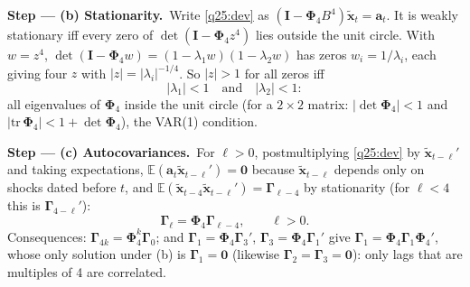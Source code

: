 \documentclass[11pt,a4paper]{article}
\numberwithin{equation}{questao}   %
\newcommand{\passo}[2]{\par\smallskip\noindent\textbf{Step --- #1.}~#2}
\newcommand{\E}{\mathbb{E}}
\begin{document}
\begin{sol}
\passo{(b) Stationarity}{Write \eqref{q25:dev} as $(\mathbf I-\boldsymbol\Phi_4B^4)\tilde{\mathbf x}_t=\mathbf a_t$.
It is weakly stationary iff every zero of $\det(\mathbf I-\boldsymbol\Phi_4z^4)$ lies outside the unit
circle. With $w=z^4$, $\det(\mathbf I-\boldsymbol\Phi_4w)=(1-\lambda_1w)(1-\lambda_2w)$ has zeros
$w_i=1/\lambda_i$, each giving four $z$ with $|z|=|\lambda_i|^{-1/4}$. So $|z|>1$ for all zeros iff}
\[
|\lambda_1|<1\quad\text{and}\quad|\lambda_2|<1 :
\]
all eigenvalues of $\boldsymbol\Phi_4$ inside the unit circle (for a $2\times2$ matrix:
$|\det\boldsymbol\Phi_4|<1$ and $|\mathrm{tr}\,\boldsymbol\Phi_4|<1+\det\boldsymbol\Phi_4$), the VAR(1) condition.

\passo{(c) Autocovariances}{For $\ell>0$, postmultiplying \eqref{q25:dev} by $\tilde{\mathbf x}_{t-\ell}'$
and taking expectations, $\E(\mathbf a_t\tilde{\mathbf x}_{t-\ell}')=\mathbf 0$ because
$\tilde{\mathbf x}_{t-\ell}$ depends only on shocks dated before $t$, and
$\E(\tilde{\mathbf x}_{t-4}\tilde{\mathbf x}_{t-\ell}')=\boldsymbol\Gamma_{\ell-4}$ by stationarity (for
$\ell<4$ this is $\boldsymbol\Gamma_{4-\ell}'$):}
\[
\boldsymbol\Gamma_\ell=\boldsymbol\Phi_4\boldsymbol\Gamma_{\ell-4},\qquad\ell>0 .
\]
Consequences: $\boldsymbol\Gamma_{4k}=\boldsymbol\Phi_4^k\boldsymbol\Gamma_0$; and
$\boldsymbol\Gamma_1=\boldsymbol\Phi_4\boldsymbol\Gamma_3'$, $\boldsymbol\Gamma_3=\boldsymbol\Phi_4\boldsymbol\Gamma_1'$ give
$\boldsymbol\Gamma_1=\boldsymbol\Phi_4\boldsymbol\Gamma_1\boldsymbol\Phi_4'$, whose only solution under (b) is
$\boldsymbol\Gamma_1=\mathbf 0$ (likewise $\boldsymbol\Gamma_2=\boldsymbol\Gamma_3=\mathbf 0$): only lags that are
multiples of 4 are correlated.


\end{sol}
\end{document}
